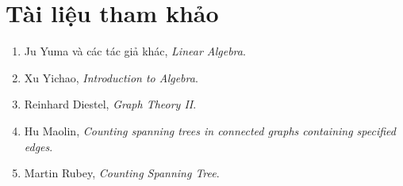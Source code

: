 \documentclass[11pt]{article}
\begin{document}
\section*{Tài liệu tham khảo}

\begin{enumerate}
  \item Ju Yuma và các tác giả khác, \textit{Linear Algebra}.
  \item Xu Yichao, \textit{Introduction to Algebra}.
  \item Reinhard Diestel, \textit{Graph Theory II}.
  \item Hu Maolin, \textit{Counting spanning trees in connected graphs
  containing specified edges}.
  \item Martin Rubey, \textit{Counting Spanning Tree}.
\end{enumerate}
\end{document}
